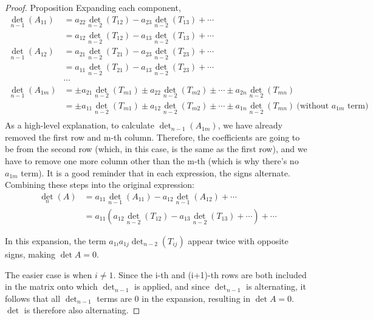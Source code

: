 \begin{proof} {Proposition}
    Expanding each component, \begin{align*}
        \det_{n-1}(A_{11}) & = a_{22} \det_{n-2}(T_{12}) - a_{23}\det_{n-2}(T_{13}) + \cdots                                                                          \\
                           & = a_{12} \det_{n-2}(T_{12}) - a_{13}\det_{n-2}(T_{13}) + \cdots                                                                          \\
        \det_{n-1}(A_{12}) & = a_{21} \det_{n-2}(T_{21}) - a_{23}\det_{n-2}(T_{23}) + \cdots                                                                          \\
                           & = a_{11} \det_{n-2}(T_{21}) - a_{13}\det_{n-2}(T_{23}) + \cdots                                                                          \\
                           & \cdots                                                                                                                                   \\
        \det_{n-1}(A_{1m}) & = \pm a_{21} \det_{n-2}(T_{m1}) \pm a_{22}\det_{n-2}(T_{m2}) \pm \cdots \pm a_{2n}\det_{n-2}(T_{mn})                                     \\
                           & =\pm a_{11} \det_{n-2}(T_{m1}) \pm a_{12}\det_{n-2}(T_{m2}) \pm \cdots \pm a_{1n}\det_{n-2}(T_{mn}) \:\text{(without \(a_{1m}\) term)}\: \\
    \end{align*}
    As a high-level explanation, to calculate \(\det_{n-1}(A_{1m})\), we have already removed the first row and m-th column. Therefore, the coefficients are going to be from the second row (which, in this case, is the same as the first row), and we have to remove one more column other than the m-th (which is why there's no \(a_{1m}\) term). It is a good reminder that in each expression, the signs alternate. Combining these steps into the original expression:
    \begin{align*}
        \det_n(A) & = a_{11}\det_{n-1}(A_{11}) - a_{12}\det_{n-1}(A_{12}) + \cdots                   \\
                  & = a_{11}(a_{12} \det_{n-2}(T_{12}) - a_{13}\det_{n-2}(T_{13}) + \cdots) + \cdots
    \end{align*}

    In this expansion, the term \(a_{1i}a_{1j}\det_{n-2}(T_{ij})\) appear twice with opposite signs, making \(\det A = 0 \).

    The easier case is when \(i \neq 1\). Since the i-th and (i+1)-th rows are both included in the matrix onto which \(\det_{n-1}\) is applied, and since \(\det_{n-1}\) is alternating, it follows that all \(\det_{n-1}\) terms are 0 in the expansion, resulting in \(\det A = 0\). \(\det\) is therefore also alternating.
\end{proof}